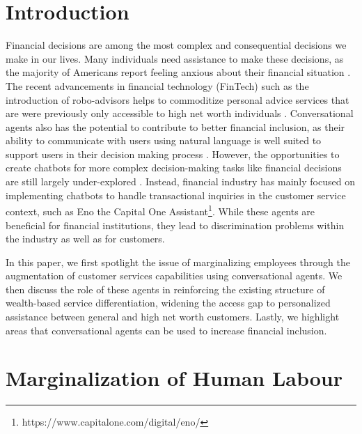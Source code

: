 \documentclass{sigchi-ext}
\begin{document}
\printccsdesc


\section{Introduction}

Financial decisions are among the most complex and consequential decisions we make in our lives. Many individuals need assistance to make these decisions, as the majority of Americans report feeling anxious about their financial situation \cite{capitalone2020}. The recent advancements in financial technology (FinTech) such as the introduction of robo-advisors helps to commoditize personal advice services that are were previously only accessible to high net worth individuals \cite{philippon2019fintech}. Conversational agents also has the potential to contribute to better financial inclusion, as their ability to communicate with users using natural language is well suited to support users in their decision making process \cite{volkel2021eliciting}. However, the opportunities to create chatbots for more complex decision-making tasks like financial decisions are still largely under-explored \cite{reicherts2022extending}. Instead, financial industry has mainly focused on implementing chatbots to handle transactional inquiries in the customer service context, such as Eno the Capital One Assistant\footnote{https://www.capitalone.com/digital/eno/}. While these agents are beneficial for financial institutions, they lead to discrimination problems within the industry as well as for customers.

In this paper, we first spotlight the issue of marginalizing employees through the augmentation of customer services capabilities using conversational agents. We then discuss the role of these agents in reinforcing the existing structure of wealth-based service differentiation, widening the access gap to personalized assistance between general and high net worth customers. Lastly, we highlight areas that conversational agents can be used to increase financial inclusion.


\section{Marginalization of Human Labour}
\end{document}
